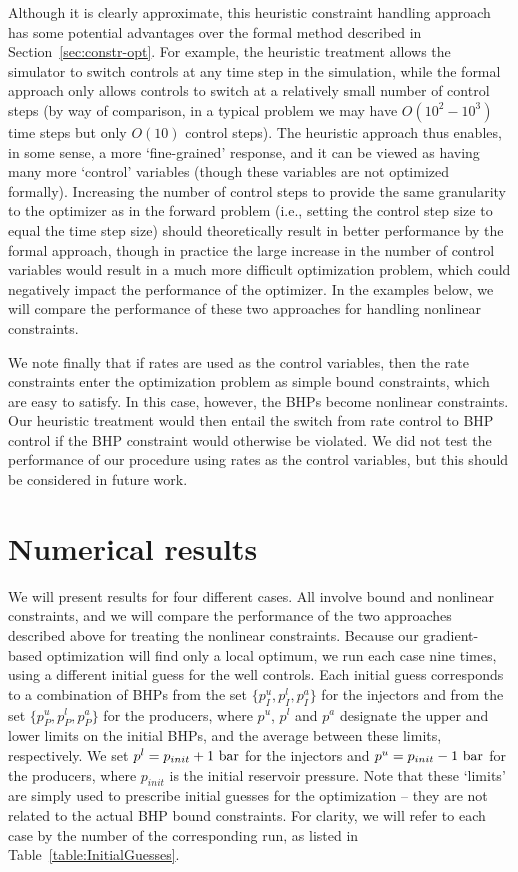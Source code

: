 \documentclass[twocolumn,numbook]{svjour3}          %
\begin{document}
Although it is clearly approximate, this heuristic constraint handling approach
has some potential advantages over the formal method described in
Section~\ref{sec:constr-opt}. For example, the heuristic treatment allows the
simulator to switch controls at any time step in the simulation, while the
formal approach only allows controls to switch at a relatively small number of
control steps (by way of comparison, in a typical problem we may have
  $O(10^2-10^3)$ time steps but only $O(10)$ control steps). The heuristic
approach thus enables, in some sense, a more `fine-grained' response, and it can
be viewed as having many more `control' variables (though these variables are
  not optimized formally). Increasing the number of control steps to provide the
same granularity to the optimizer as in the forward problem (i.e., setting the
  control step size to equal the time step size) should theoretically result in
better performance by the formal approach, though in practice the large
increase in the number of control variables would result in a much more difficult optimization
problem, which could negatively impact the performance of the optimizer. In the examples
below, we will compare the performance of these two approaches for handling
nonlinear constraints.

We note finally that if rates are used as the control variables, then the rate
constraints enter the optimization problem as simple bound constraints, which
are easy to satisfy. In this case, however, the BHPs become nonlinear
constraints. Our heuristic treatment would then entail the switch from rate
control to BHP control if the BHP constraint would otherwise be violated. We did
not test the performance of our procedure using rates as the control variables,
but this should be considered in future work.



\section{Numerical results}  \label{sec:results}

We will present results for four different cases. All involve bound and
nonlinear constraints, and we will compare the performance of the two approaches
described above for treating the nonlinear constraints. Because our
gradient-based optimization will find only a local optimum, we run each case
nine times, using a different initial guess for the well controls. Each initial
guess corresponds to a combination of BHPs from the set $\{p_I^u,p_I^l,p_I^a\}$
for the injectors and from the set $\{p_P^u,p_P^l,p_P^a\}$ for the producers,
where $p^u$, $p^l$ and $p^a$ designate the upper and lower limits on the
initial BHPs, and the average between these limits, respectively. We set
$p^l=p_{init}+1~{\rm bar}$ for the injectors and $p^u=p_{init}-1~{\rm bar}$
for the producers, where $p_{init}$ is the initial reservoir pressure. Note
that these `limits' are simply used to prescribe initial guesses for the
optimization -- they are not related to the actual BHP bound constraints.
For clarity, we will refer to each case by the number of the corresponding
run, as listed in Table~\ref{table:InitialGuesses}.
\end{document}
